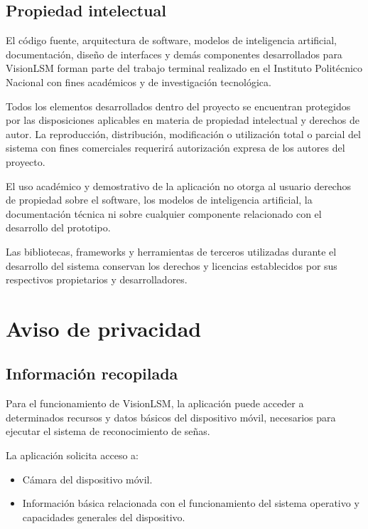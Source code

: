 	\subsection{Propiedad intelectual}
	
	El código fuente, arquitectura de software, modelos de inteligencia artificial, documentación, diseño de interfaces y demás componentes desarrollados para VisionLSM forman parte del trabajo terminal realizado en el Instituto Politécnico Nacional con fines académicos y de investigación tecnológica.
	
	Todos los elementos desarrollados dentro del proyecto se encuentran protegidos por las disposiciones aplicables en materia de propiedad intelectual y derechos de autor. La reproducción, distribución, modificación o utilización total o parcial del sistema con fines comerciales requerirá autorización expresa de los autores del proyecto.
	
	El uso académico y demostrativo de la aplicación no otorga al usuario derechos de propiedad sobre el software, los modelos de inteligencia artificial, la documentación técnica ni sobre cualquier componente relacionado con el desarrollo del prototipo.
	
	Las bibliotecas, frameworks y herramientas de terceros utilizadas durante el desarrollo del sistema conservan los derechos y licencias establecidos por sus respectivos propietarios y desarrolladores.
	
	\section{Aviso de privacidad}

	\subsection{Información recopilada}
	
	Para el funcionamiento de VisionLSM, la aplicación puede acceder a determinados recursos y datos básicos del dispositivo móvil, necesarios para ejecutar el sistema de reconocimiento de señas.
	
	La aplicación solicita acceso a:
	
	\begin{itemize}
		\item Cámara del dispositivo móvil.
		
		\item Información básica relacionada con el funcionamiento del sistema operativo y capacidades generales del dispositivo.
	\end{itemize}
	
